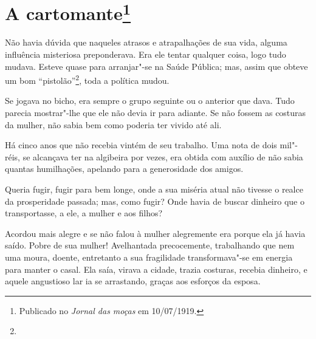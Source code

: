 
\chapter[A cartomante]{A cartomante\footnote[*]{Publicado no \emph{Jornal das moças} em 10/07/1919.}}

Não havia dúvida que naqueles atrasos e atrapalhações de sua vida,
alguma influência misteriosa preponderava. Era ele tentar qualquer
coisa, logo tudo mudava. Esteve quase para arranjar"-se na Saúde Pública;
mas, assim que obteve um bom ``pistolão''\footnote{}, toda a política mudou.

Se jogava no bicho, era sempre o grupo seguinte ou o anterior que dava.
Tudo parecia mostrar"-lhe que ele não devia ir para adiante. Se não
fossem as costuras da mulher, não sabia bem como poderia ter vivido até
ali.

Há cinco anos que não recebia vintém de seu trabalho. Uma nota de dois
mil"-réis, se alcançava ter na algibeira por vezes, era obtida com
auxílio de não sabia quantas humilhações, apelando para a generosidade
dos amigos.

Queria fugir, fugir para bem longe, onde a sua miséria atual não tivesse
o realce da prosperidade passada; mas, como fugir? Onde havia de buscar
dinheiro que o transportasse, a ele, a mulher e aos filhos?


Acordou mais alegre e se não falou à mulher alegremente era porque ela
já havia saído. Pobre de sua mulher! Avelhantada precocemente,
trabalhando que nem uma moura, doente, entretanto a sua fragilidade
transformava"-se em energia para manter o casal. Ela saía, virava a
cidade, trazia costuras, recebia dinheiro, e aquele angustioso lar ia se
arrastando, graças aos esforços da esposa.

